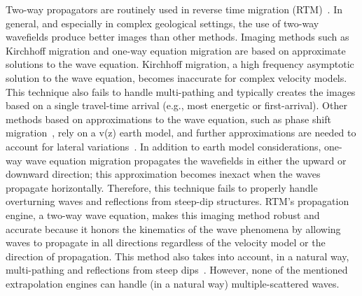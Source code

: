  
 Two-way propagators are routinely used in reverse time migration (RTM)~\citep{baysal:1514, whitmore:382, GPR:GPR413}.
 In general, and especially in complex geological settings, the use of two-way wavefields
produce better images than other methods. Imaging methods such as Kirchhoff migration and one-way equation
 migration are based on approximate solutions to the wave equation. Kirchhoff migration,
 a high frequency asymptotic solution to the wave equation, becomes inaccurate for complex velocity models.
 This technique also fails to handle multi-pathing and typically creates the images based on a 
single travel-time arrival (e.g., most energetic or first-arrival). Other methods based on approximations to the wave
 equation, such as phase shift migration~\citep{gazdag:1342}, rely on a v(z) earth model, and further
 approximations are needed to account for lateral variations~\citep{gazdag:124}.
 In addition to earth model considerations, one-way wave equation migration propagates the wavefields in 
either the upward or downward direction; this approximation becomes inexact when the waves 
propagate horizontally. Therefore, this technique fails to properly handle overturning
waves and reflections from steep-dip structures. RTM's propagation engine, a two-way wave equation, 
makes this imaging method robust and accurate because it honors the kinematics of 
the wave phenomena by allowing waves to propagate in all directions regardless of
 the velocity model or the direction of propagation. This method also takes into account,
 in a natural way, multi-pathing and  reflections from steep dips~\citep{Gray2001,Etgen2009}.
 However, none of the mentioned extrapolation engines can handle (in a natural way) multiple-scattered 
waves. 

%
%
%
